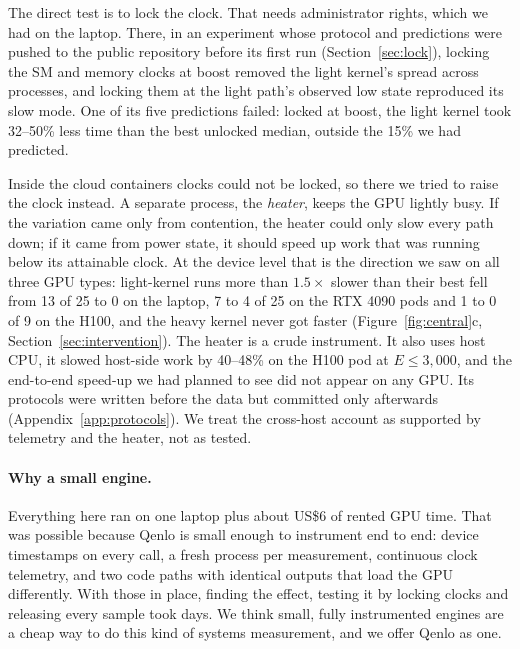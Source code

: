 \documentclass[10pt,twocolumn]{article}
\begin{document}
The direct test is to lock the clock. That needs administrator rights, which we had on the laptop. There, in an experiment whose protocol and predictions were pushed to the public repository before its first run (Section~\ref{sec:lock}), locking the SM and memory clocks at boost removed the light kernel's spread across processes, and locking them at the light path's observed low state reproduced its slow mode. One of its five predictions failed: locked at boost, the light kernel took 32--50\% less time than the best unlocked median, outside the 15\% we had predicted.

Inside the cloud containers clocks could not be locked, so there we tried to raise the clock instead. A separate process, the \emph{heater}, keeps the GPU lightly busy. If the variation came only from contention, the heater could only slow every path down; if it came from power state, it should speed up work that was running below its attainable clock. At the device level that is the direction we saw on all three GPU types: light-kernel runs more than $1.5\times$ slower than their best fell from 13 of 25 to 0 on the laptop, 7 to 4 of 25 on the RTX 4090 pods and 1 to 0 of 9 on the H100, and the heavy kernel never got faster (Figure~\ref{fig:central}c, Section~\ref{sec:intervention}). The heater is a crude instrument. It also uses host CPU, it slowed host-side work by 40--48\% on the H100 pod at $E\le 3{,}000$, and the end-to-end speed-up we had planned to see did not appear on any GPU. Its protocols were written before the data but committed only afterwards (Appendix~\ref{app:protocols}). We treat the cross-host account as supported by telemetry and the heater, not as tested.

\paragraph{Why a small engine.} Everything here ran on one laptop plus about US\$6 of rented GPU time. That was possible because Qenlo is small enough to instrument end to end: device timestamps on every call, a fresh process per measurement, continuous clock telemetry, and two code paths with identical outputs that load the GPU differently. With those in place, finding the effect, testing it by locking clocks and releasing every sample took days. We think small, fully instrumented engines are a cheap way to do this kind of systems measurement, and we offer Qenlo as one.
\end{document}
